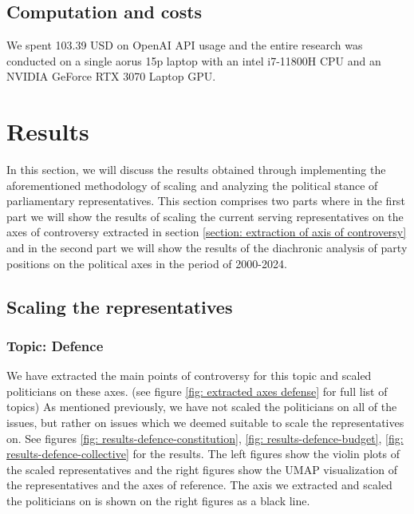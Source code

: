 \documentclass[final,5p,times,twocolumn,authoryear]{elsarticle}
\begin{document}
\subsection{Computation and costs}
We spent 103.39 USD on OpenAI API usage and the entire research was conducted on a single aorus 15p laptop with an intel i7-11800H CPU and an NVIDIA GeForce RTX 3070 Laptop GPU. 

\FloatBarrier

\section{Results}
\label{section:results}
In this section, we will discuss the results obtained through implementing the aforementioned methodology of scaling and analyzing the political stance of parliamentary representatives. This section comprises two parts where in the first part we will show the results of scaling the current serving representatives on the axes of controversy extracted in section \ref{section: extraction of axis of controversy} and in the second part we will show the results of the diachronic analysis of party positions on the political axes in the period of 2000-2024.

\subsection{Scaling the representatives}
\subsubsection{Topic: Defence}
We have extracted the main points of controversy for this topic and scaled politicians on these axes. (see figure \ref{fig: extracted axes defense} for full list of topics) As mentioned previously, we have not scaled the politicians on all of the issues, but rather on issues which we deemed suitable to scale the representatives on. See figures \ref{fig: results-defence-constitution}, \ref{fig: results-defence-budget}, \ref{fig: results-defence-collective} for the results. The left figures show the violin plots of the scaled representatives and the right figures show the UMAP visualization of the representatives and the axes of reference. The axis we extracted and scaled the politicians on is shown on the right figures as a black line. 
\end{document}
